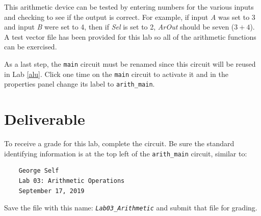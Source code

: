 This arithmetic device can be tested by entering numbers for the various inputs and checking to see if the output is correct. For example, if input \textit{A} was set to 3 and input \textit{B} were set to 4, then if \textit{Sel} is set to 2, \textit{ArOut} should be seven ($ 3+4 $). A test vector file has been provided for this lab so all of the arithmetic functions can be exercised.

As a last step, the \lstinline[columns=fixed]|main| circuit must be renamed since this circuit will be reused in Lab \ref{alu}. Click one time on the \lstinline[columns=fixed]|main| circuit to activate it and in the properties panel change its label to \lstinline[columns=fixed]|arith_main|.

\section{Deliverable}

To receive a grade for this lab, complete the circuit. Be sure the standard identifying information is at the top left of the \lstinline[columns=fixed]|arith_main| circuit, similar to: 

\bigskip
\begin{minipage}{\linewidth}
	\begin{verbatim}
	George Self
	Lab 03: Arithmetic Operations
	September 17, 2019
	\end{verbatim}
\end{minipage}
\bigskip

Save the file with this name: \emph{\texttt{Lab03\_Arithmetic}} and submit that file for grading.


